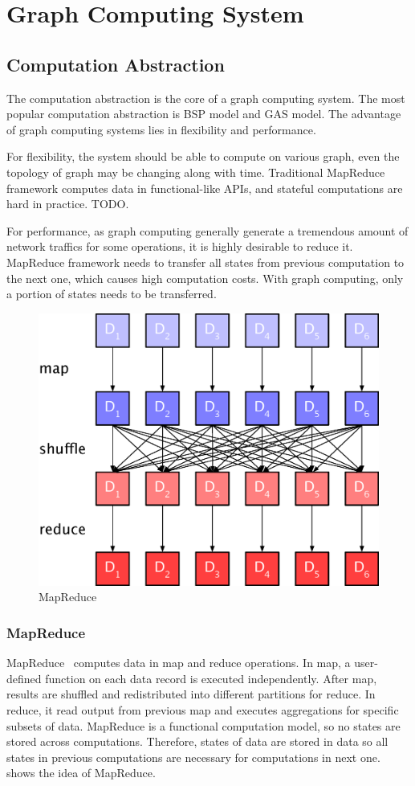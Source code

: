 \section{Graph Computing System}
\subsection{Computation Abstraction}
The computation abstraction is the core of a graph computing system. The
most popular computation abstraction is BSP model and GAS model.
The advantage of graph computing systems lies in flexibility and performance.

For flexibility, the system should be able to compute on various
graph, even the topology of graph may be changing along with time.
Traditional MapReduce framework computes data in functional-like
APIs, and stateful computations are hard in practice. TODO.

For performance, as graph computing generally generate a tremendous
amount of network traffics for some operations,
it is highly desirable to reduce it. MapReduce framework needs to transfer
all states from previous computation to the next one, which causes high computation
costs. With graph computing, only a portion of states needs to be transferred.

\begin{figure}[tbh]
  \center
  \includegraphics[width=.8\linewidth]{figures/mrmodel}
  \caption{MapReduce}
  \label{fig:mrmodel}
\end{figure}
\subsubsection{MapReduce}
MapReduce~\cite{mapreduce} computes data in map and reduce operations.
In map, a user-defined function on each data record is executed independently.
After map, results are shuffled and redistributed into different partitions
for reduce. In reduce, it read output from previous map and executes
aggregations for specific subsets of data. MapReduce is a functional
computation model, so no states are stored across computations.
Therefore, states of data are stored in data so all states
in previous computations are necessary
for computations in next one.  shows the idea of MapReduce.


